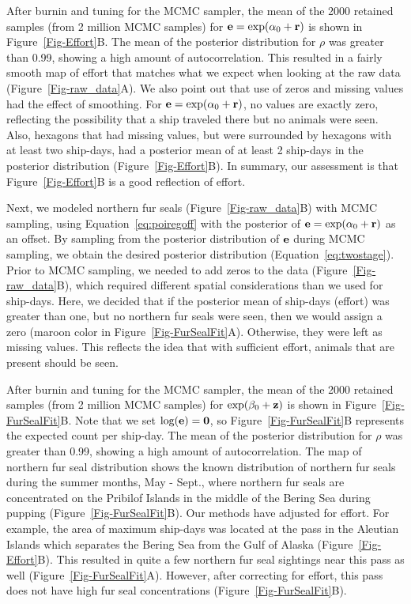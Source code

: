 \documentclass[11pt, titlepage]{article}
\begin{document}
\begin{spacing}{1.9}
\begin{flushleft}
After burnin and tuning for the MCMC sampler, the mean of the 2000 retained samples (from 2 million MCMC samples) for $\mathbf{e} = \exp(\alpha_{0} + \mathbf{r})$ is shown in Figure~\ref{Fig-Effort}B.  The mean of the posterior distribution for $\rho$ was greater than 0.99, showing a high amount of autocorrelation.  This resulted in a fairly smooth map of effort that matches what we expect when looking at the raw data (Figure~\ref{Fig-raw_data}A).  We also point out that use of zeros and missing values had the effect of smoothing. For $\mathbf{e} = \exp(\alpha_{0} + \mathbf{r})$, no values are exactly zero, reflecting the possibility that a ship traveled there but no animals were seen.  Also, hexagons that had missing values, but were surrounded by hexagons with at least two ship-days, had a posterior mean of at least 2 ship-days in the posterior distribution (Figure~\ref{Fig-Effort}B).  In summary, our assessment is that Figure~\ref{Fig-Effort}B is a good reflection of effort.

Next, we modeled northern fur seals (Figure~\ref{Fig-raw_data}B) with MCMC sampling, using Equation~\eqref{eq:poiregoff} with the posterior of $\mathbf{e} = \exp(\alpha_{0} + \mathbf{r})$ as an offset. By sampling from the posterior distribution of $\mathbf{e}$ during MCMC sampling, we obtain the desired posterior distribution (Equation~\ref{eq:twostage}). Prior to MCMC sampling, we needed to add zeros to the data (Figure~\ref{Fig-raw_data}B), which required different spatial considerations than we used for ship-days. Here, we decided that if the posterior mean of ship-days (effort) was greater than one, but no northern fur seals were seen, then we would assign a zero (maroon color in Figure~\ref{Fig-FurSealFit}A). Otherwise, they were left as missing values.  This reflects the idea that with sufficient effort, animals that are present should be seen.  
 
After burnin and tuning for the MCMC sampler, the mean of the 2000 retained samples (from 2 million MCMC samples) for $\exp(\beta_{0} + \mathbf{z})$ is shown in Figure~\ref{Fig-FurSealFit}B.  Note that we set $\textrm{log}(\mathbf{e}) = \mathbf{0}$, so Figure~\ref{Fig-FurSealFit}B represents the expected count per ship-day. The mean of the posterior distribution for $\rho$ was greater than 0.99, showing a high amount of autocorrelation.  The map of northern fur seal distribution shows the known distribution of northern fur seals during the summer months, May - Sept., where northern fur seals are concentrated on the Pribilof Islands in the middle of the Bering Sea during pupping (Figure~\ref{Fig-FurSealFit}B).  Our methods have adjusted for effort. For example, the area of maximum ship-days was located at the pass in the Aleutian Islands which separates the Bering Sea from the Gulf of Alaska (Figure~\ref{Fig-Effort}B).  This resulted in quite a few northern fur seal sightings near this pass as well (Figure~\ref{Fig-FurSealFit}A).  However, after correcting for effort, this pass does not have high fur seal concentrations (Figure~\ref{Fig-FurSealFit}B).


\end{flushleft}
\end{spacing}
\end{document}
